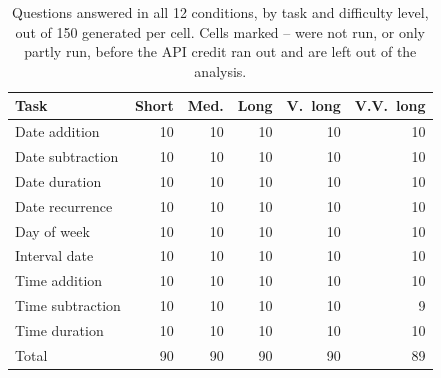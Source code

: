 \begin{table}[t]
\centering
\small
\setlength{\tabcolsep}{3.5pt}
\begin{tabular}{@{}lrrrrr@{}}
\toprule
Task & Short & Med. & Long & V.\ long & V.V.\ long \\
\midrule
Date addition & 10 & 10 & 10 & 10 & 10 \\
Date subtraction & 10 & 10 & 10 & 10 & 10 \\
Date duration & 10 & 10 & 10 & 10 & 10 \\
Date recurrence & 10 & 10 & 10 & 10 & 10 \\
Day of week & 10 & 10 & 10 & 10 & 10 \\
Interval date & 10 & 10 & 10 & 10 & 10 \\
Time addition & 10 & 10 & 10 & 10 & 10 \\
Time subtraction & 10 & 10 & 10 & 10 & 9 \\
Time duration & 10 & 10 & 10 & 10 & 10 \\
\midrule
Total & 90 & 90 & 90 & 90 & 89 \\
\bottomrule
\end{tabular}
\caption{Questions answered in all 12 conditions, by task and difficulty level, out of 150 generated per cell. Cells marked -- were not run, or only partly run, before the API credit ran out and are left out of the analysis.}
\label{tab:coverage}
\end{table}
